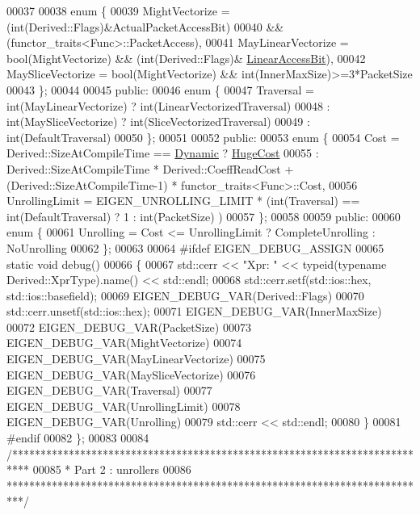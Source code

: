 \begin{DoxyCode}
00037 
00038   \textcolor{keyword}{enum} \{
00039     MightVectorize = (int(Derived::Flags)&ActualPacketAccessBit)
00040                   && (functor\_traits<Func>::PacketAccess),
00041     MayLinearVectorize = bool(MightVectorize) && (int(Derived::Flags)&
      \hyperlink{group__flags_ga4b983a15d57cd55806df618ac544d09e}{LinearAccessBit}),
00042     MaySliceVectorize  = \textcolor{keywordtype}{bool}(MightVectorize) && int(InnerMaxSize)>=3*PacketSize
00043   \};
00044 
00045 \textcolor{keyword}{public}:
00046   \textcolor{keyword}{enum} \{
00047     Traversal = int(MayLinearVectorize) ? int(LinearVectorizedTraversal)
00048               : int(MaySliceVectorize)  ? int(SliceVectorizedTraversal)
00049                                         : int(DefaultTraversal)
00050   \};
00051 
00052 \textcolor{keyword}{public}:
00053   \textcolor{keyword}{enum} \{
00054     Cost = Derived::SizeAtCompileTime == \hyperlink{namespace_eigen_ad81fa7195215a0ce30017dfac309f0b2}{Dynamic} ? \hyperlink{namespace_eigen_a3163430a1c13173faffde69016b48aaf}{HugeCost}
00055          : Derived::SizeAtCompileTime * Derived::CoeffReadCost + (Derived::SizeAtCompileTime-1) * 
      functor\_traits<Func>::Cost,
00056     UnrollingLimit = EIGEN\_UNROLLING\_LIMIT * (\textcolor{keywordtype}{int}(Traversal) == int(DefaultTraversal) ? 1 : int(PacketSize)
      )
00057   \};
00058 
00059 \textcolor{keyword}{public}:
00060   \textcolor{keyword}{enum} \{
00061     Unrolling = Cost <= UnrollingLimit ? CompleteUnrolling : NoUnrolling
00062   \};
00063   
00064 \textcolor{preprocessor}{#ifdef EIGEN\_DEBUG\_ASSIGN}
00065   \textcolor{keyword}{static} \textcolor{keywordtype}{void} debug()
00066   \{
00067     std::cerr << \textcolor{stringliteral}{"Xpr: "} << \textcolor{keyword}{typeid}(\textcolor{keyword}{typename} Derived::XprType).name() << std::endl;
00068     std::cerr.setf(std::ios::hex, std::ios::basefield);
00069     EIGEN\_DEBUG\_VAR(Derived::Flags)
00070     std::cerr.unsetf(std::ios::hex);
00071     EIGEN\_DEBUG\_VAR(InnerMaxSize)
00072     EIGEN\_DEBUG\_VAR(PacketSize)
00073     EIGEN\_DEBUG\_VAR(MightVectorize)
00074     EIGEN\_DEBUG\_VAR(MayLinearVectorize)
00075     EIGEN\_DEBUG\_VAR(MaySliceVectorize)
00076     EIGEN\_DEBUG\_VAR(Traversal)
00077     EIGEN\_DEBUG\_VAR(UnrollingLimit)
00078     EIGEN\_DEBUG\_VAR(Unrolling)
00079     std::cerr << std::endl;
00080   \}
00081 \textcolor{preprocessor}{#endif}
00082 \};
00083 
00084 \textcolor{comment}{/***************************************************************************}
00085 \textcolor{comment}{* Part 2 : unrollers}
00086 \textcolor{comment}{***************************************************************************/}

\end{DoxyCode}
